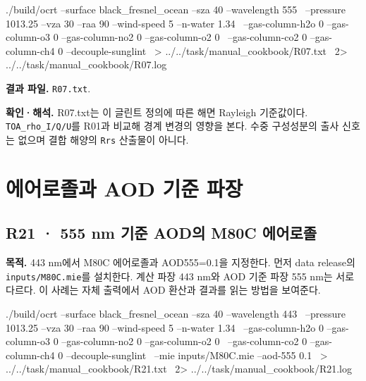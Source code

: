 \noindent\begin{minipage}{\linewidth}
\begin{ManualCode}

./build/ocrt --surface black_fresnel_ocean --sza 40 --wavelength 555 \
  --pressure 1013.25 --vza 30 --raa 90 --wind-speed 5 --n-water 1.34 \
  --gas-column-h2o 0 --gas-column-o3 0 --gas-column-no2 0 --gas-column-o2 0 \
  --gas-column-co2 0 --gas-column-ch4 0 --decouple-sunglint \
  > ../../task/manual_cookbook/R07.txt \
  2> ../../task/manual_cookbook/R07.log

\end{ManualCode}
\end{minipage}\par

\textbf{결과 파일. }\texttt{R07.txt}.

\textbf{확인·해석. }R07.txt는 이 글린트 정의에 따른 해면 Rayleigh 기준값이다. \texttt{TOA\_\allowbreak{}rho\_\allowbreak{}I/\allowbreak{}Q/\allowbreak{}U}를 R01과 비교해 경계 변경의 영향을 본다. 수중 구성성분의 출사 신호는 없으며 결합 해양의 \texttt{Rrs} 산출물이 아니다.

\clearpage

\section{에어로졸과 AOD 기준 파장}

\label{sec:auto:09_cookbook:4}

\label{sec:cookbook_group:aerosol}

\subsection{R21 · 555 nm 기준 AOD의 M80C 에어로졸}
\label{sec:auto:09_cookbook:4.1}

\label{recipe:R21}

\textbf{목적. }443 nm에서 M80C 에어로졸과 AOD555=0.1을 지정한다. 먼저 data release의 \texttt{inputs/\allowbreak{}M80C.mie}를 설치한다. 계산 파장 443 nm와 AOD 기준 파장 555 nm는 서로 다르다. 이 사례는 자체 출력에서 AOD 환산과 결과를 읽는 방법을 보여준다.

\noindent\begin{minipage}{\linewidth}
\begin{ManualCode}

./build/ocrt --surface black_fresnel_ocean --sza 40 --wavelength 443 \
  --pressure 1013.25 --vza 30 --raa 90 --wind-speed 5 --n-water 1.34 \
  --gas-column-h2o 0 --gas-column-o3 0 --gas-column-no2 0 --gas-column-o2 0 \
  --gas-column-co2 0 --gas-column-ch4 0 --decouple-sunglint \
  --mie inputs/M80C.mie --aod-555 0.1 \
  > ../../task/manual_cookbook/R21.txt \
  2> ../../task/manual_cookbook/R21.log

\end{ManualCode}
\end{minipage}\par

